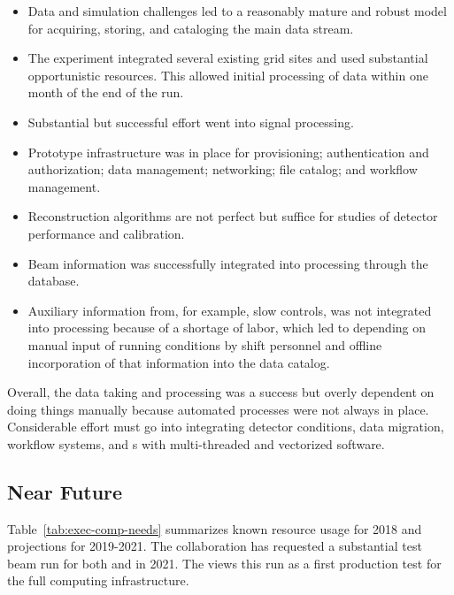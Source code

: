 \begin{itemize}
    \item Data and simulation challenges led to a reasonably mature and robust model for acquiring, storing, and cataloging the main data stream. 
    \item The experiment integrated several existing grid sites and used substantial opportunistic resources.  This allowed initial processing of data within one month of the end of the run.
    \item Substantial but successful effort went into signal processing. 
    \item Prototype infrastructure was in place for provisioning; authentication and authorization; data management; networking; file catalog; and workflow management. 
    \item Reconstruction algorithms are not perfect but suffice for studies of detector performance and calibration. 
    \item Beam information was successfully integrated into processing through the  database.
    \item Auxiliary information from, for example, slow controls, was not integrated into processing because of a shortage of labor, which led to depending on manual input of running conditions by shift personnel and offline incorporation of that information into the data catalog. 
\end{itemize}

Overall, the  data taking and processing was a success but overly dependent on doing things manually because automated processes were not always in place. Considerable effort must go into integrating detector conditions, data migration, workflow systems, and s with multi-threaded and vectorized software.

\subsection{Near Future}

Table~\ref{tab:exec-comp-needs} summarizes known resource usage for 2018 and projections for 2019-2021.  The collaboration has requested a substantial test beam run for both  and   in 2021.  The  views this run as a first production test for the full  computing infrastructure. 





